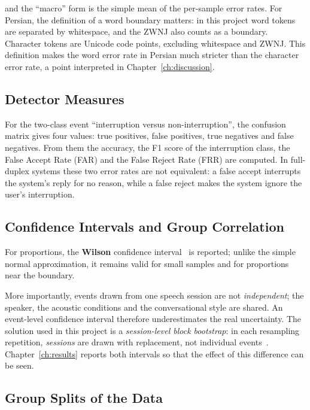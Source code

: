 and the ``macro'' form is the simple mean of the per-sample error rates. For
Persian, the definition of a word boundary matters: in this project word tokens are
separated by whitespace, and the ZWNJ also counts as a boundary. Character tokens
are Unicode code points, excluding whitespace and ZWNJ. This definition makes the
word error rate in Persian much stricter than the character error rate, a point
interpreted in Chapter~\ref{ch:discussion}.

\subsection{Detector Measures}

For the two-class event ``interruption versus non-interruption'', the confusion
matrix gives four values: true positives, false positives, true negatives and false
negatives. From them the accuracy, the F1 score of the interruption class, the False
Accept Rate (FAR) and the False Reject Rate (FRR) are computed. In full-duplex
systems these two error rates are not equivalent: a false accept interrupts the
system's reply for no reason, while a false reject makes the system ignore the
user's interruption.

\subsection{Confidence Intervals and Group Correlation}

For proportions, the \textbf{Wilson} confidence interval~\cite{wilson1927interval} is
reported; unlike the simple normal approximation, it remains valid for small samples
and for proportions near the boundary.

More importantly, events drawn from one speech session are not \emph{independent};
the speaker, the acoustic conditions and the conversational style are shared. An
event-level confidence interval therefore underestimates the real uncertainty. The
solution used in this project is a \emph{session-level block bootstrap}: in each
resampling repetition, \emph{sessions} are drawn with replacement, not individual
events~\cite{efron1994bootstrap}. Chapter~\ref{ch:results} reports both intervals so
that the effect of this difference can be seen.

\subsection{Group Splits of the Data}
\label{sec:group-split}

